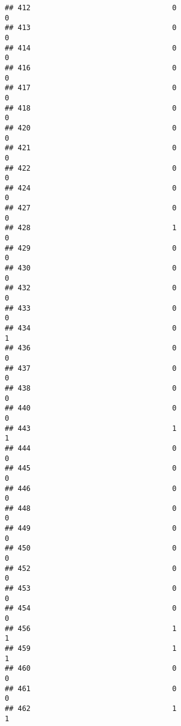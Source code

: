 \documentclass[
]{article}
\begin{document}
\begin{verbatim}
## 412                                 0                                0
## 413                                 0                                0
## 414                                 0                                0
## 416                                 0                                0
## 417                                 0                                0
## 418                                 0                                0
## 420                                 0                                0
## 421                                 0                                0
## 422                                 0                                0
## 424                                 0                                0
## 427                                 0                                0
## 428                                 1                                0
## 429                                 0                                0
## 430                                 0                                0
## 432                                 0                                0
## 433                                 0                                0
## 434                                 0                                1
## 436                                 0                                0
## 437                                 0                                0
## 438                                 0                                0
## 440                                 0                                0
## 443                                 1                                1
## 444                                 0                                0
## 445                                 0                                0
## 446                                 0                                0
## 448                                 0                                0
## 449                                 0                                0
## 450                                 0                                0
## 452                                 0                                0
## 453                                 0                                0
## 454                                 0                                0
## 456                                 1                                1
## 459                                 1                                1
## 460                                 0                                0
## 461                                 0                                0
## 462                                 1                                1

\end{verbatim}
\end{document}
